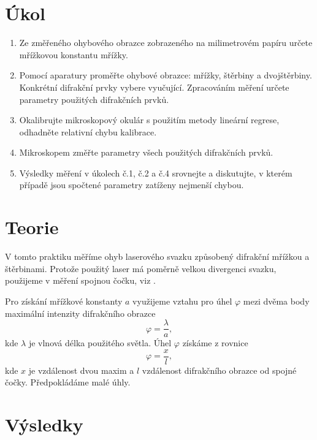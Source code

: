 \documentclass{protokol}
\begin{document}
  \section*{Úkol}

    \begin{enumerate}
      \item Ze změřeného ohybového obrazce zobrazeného na milimetrovém papíru určete mřížkovou konstantu mřížky.
      \item Pomocí aparatury proměřte ohybové obrazce: mřížky, štěrbiny a dvojštěrbiny. Konkrétní difrakční prvky vybere vyučující. Zpracováním měření určete parametry použitých difrakčních prvků.
      \item Okalibrujte mikroskopový okulár s použitím metody lineární regrese, odhadněte relativní chybu kalibrace.
      \item Mikroskopem změřte parametry všech použitých difrakčních prvků.
      \item Výsledky měření v úkolech č.1, č.2 a č.4 srovnejte a diskutujte, v kterém případě jsou spočtené parametry zatíženy nejmenší chybou. 
    \end{enumerate}

  \section*{Teorie}

    V tomto praktiku měříme ohyb laserového svazku způsobený difrakční mřížkou a štěrbinami. Protože použitý laser má poměrně velkou divergenci svazku, použijeme v měření spojnou čočku, viz \cite{mereni}. 

    Pro získání mřížkové konstanty $a$ využijeme vztahu pro úhel $\varphi$ mezi dvěma body maximální intenzity difrakčního obrazce
    \begin{equation} \label{eq:mrizkova_konstanta}
      \varphi = \frac{\lambda}{a},
    \end{equation} 
    kde $\lambda$ je vlnová délka použitého světla. Úhel $\varphi$ získáme z rovnice
    \begin{equation} \label{eq:phi}
      \varphi = \frac{x}{l},
    \end{equation}
    kde $x$ je vzdálenost dvou maxim a $l$ vzdálenost difrakčního obrazce od spojné čočky. Předpokládáme malé úhly.

  \section*{Výsledky}
\end{document}
